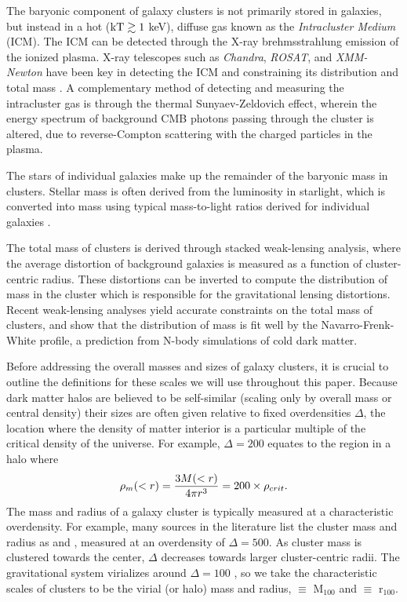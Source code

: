 The baryonic component of galaxy clusters is not primarily stored in
galaxies, but instead in a hot ($\textrm{kT} \gtrsim 1$ keV), diffuse
gas known as the \textit{Intracluster Medium} (ICM). The ICM can be
detected through the X-ray brehmsstrahlung emission of the ionized
plasma. X-ray telescopes such as \textit{Chandra}, \textit{ROSAT}, and
\textit{XMM-Newton} have been key in detecting the ICM and
constraining its distribution and total mass . A complementary method
of detecting and measuring the intracluster gas is through the thermal
Sunyaev-Zeldovich \citep[SZ,][]{Sunyaev1972} effect, wherein the
energy spectrum of background CMB photons passing through the cluster
is altered, due to reverse-Compton scattering with the charged
particles in the plasma.

The stars of individual galaxies make up the remainder of the baryonic
mass in clusters. Stellar mass is often derived from the luminosity in
starlight, which is converted into mass using typical mass-to-light
ratios derived for individual galaxies \citep{Bahcall2014}.

The total mass of clusters is derived through stacked weak-lensing
analysis, where the average distortion of background galaxies is
measured as a function of cluster-centric radius. These distortions
can be inverted to compute the distribution of mass in the cluster
which is responsible for the gravitational lensing distortions. Recent
weak-lensing analyses \citep{Mandelbaum2008, Sheldon2009} yield
accurate constraints on the total mass of clusters, and show that the
distribution of mass is fit well by the Navarro-Frenk-White
\citep[NFW,][]{Navarro1996} profile, a prediction from N-body
simulations of cold dark matter.

Before addressing the overall masses and sizes of galaxy clusters, it
is crucial to outline the definitions for these scales we will use
throughout this paper. Because dark matter halos are believed to be
self-similar (scaling only by overall mass or central density) their
sizes are often given relative to fixed overdensities $\Delta$, the
location where the density of matter interior is a particular multiple of
the critical density of the universe. For example, $\Delta = 200$
equates to the region in a halo where
\begin{equation}
\rho_m(<r) = \frac{3M(<r)}{4\pi{}r^3} = 200\times\rho_{crit}. \nonumber
\end{equation}
The mass and radius of a galaxy cluster is typically measured at a
characteristic overdensity. For example, many sources in the
literature list the cluster mass and radius as \Mfive{} and
\rfive{}, measured at an overdensity of $\Delta = 500$. As cluster
mass is clustered towards the center, $\Delta$ decreases towards
larger cluster-centric radii. The gravitational system virializes
around $\Delta = 100$ \citep{Eke1996}, so we take the characteristic
scales of clusters to be the virial (or halo) mass and radius,
\Mvir{} $ \equiv $ M$_{100}$ and \rvir{} $ \equiv $ r$_{100}$.

